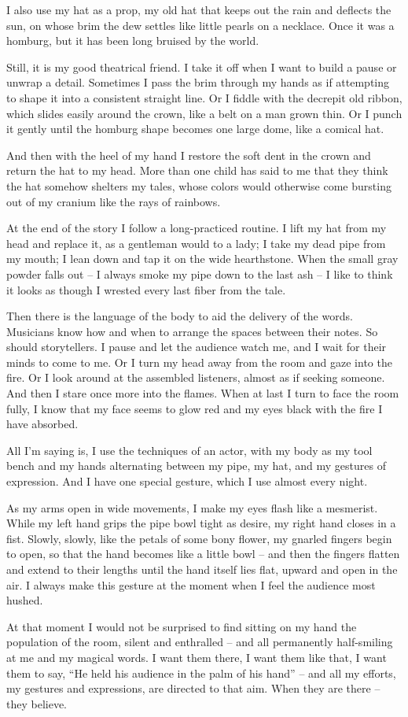 \documentclass[openany]{memoir}
\begin{document}
I also use my hat as a prop, my old hat that keeps out the rain and deflects the sun, on whose brim the dew settles like little pearls on a necklace.
Once it was a homburg, but it has been long bruised by the world.

Still, it is my good theatrical friend.
I take it off when I want to build a pause or unwrap a detail.
Sometimes I pass the brim through my hands as if attempting to shape it into a consistent straight line.
Or I fiddle with the decrepit old ribbon, which slides easily around the crown, like a belt on a man grown thin.
Or I punch it gently until the homburg shape becomes one large dome, like a comical hat.

And then with the heel of my hand I restore the soft dent in the crown and return the hat to my head.
More than one child has said to me that they think the hat somehow shelters my tales, whose colors would otherwise come bursting out of my cranium like the rays of rainbows.

At the end of the story I follow a long-practiced routine.
I lift my hat from my head and replace it, as a gentleman would to a lady; I take my dead pipe from my mouth; I lean down and tap it on the wide hearthstone.
When the small gray powder falls out -- I always smoke my pipe down to the last ash -- I like to think it looks as though I wrested every last fiber from the tale.

\vspace{1em}

\noindent Then there is the language of the body to aid the delivery of the words.
Musicians know how and when to arrange the spaces between their notes.
So should storytellers.
I pause and let the audience watch me, and I wait for their minds to come to me.
Or I turn my head away from the room and gaze into the fire.
Or I look around at the assembled listeners, almost as if seeking someone.
And then I stare once more into the flames.
When at last I turn to face the room fully, I know that my face seems to glow red and my eyes black with the fire I have absorbed.

All I'm saying is, I use the techniques of an actor, with my body as my tool bench and my hands alternating between my pipe, my hat, and my gestures of expression.
And I have one special gesture, which I use almost every night.

As my arms open in wide movements, I make my eyes flash like a mesmerist.
While my left hand grips the pipe bowl tight as desire, my right hand closes in a fist.
Slowly, slowly, like the petals of some bony flower, my gnarled fingers begin to open, so that the hand becomes like a little bowl -- and then the fingers flatten and extend to their lengths until the hand itself lies flat, upward and open in the air.
I always make this gesture at the moment when I feel the audience most hushed.

At that moment I would not be surprised to find sitting on my hand the population of the room, silent and enthralled -- and all permanently half-smiling at me and my magical words.
I want them there, I want them like that, I want them to say, ``He held his audience in the palm of his hand'' -- and all my efforts, my gestures and expressions, are directed to that aim.
When they are there -- they believe.
\end{document}
